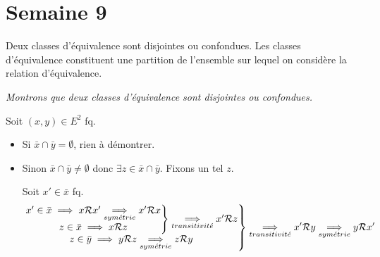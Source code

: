 \documentclass{article}
\renewenvironment{question_kholle}[2][ ]
{
	\subsection{\texorpdfstring{#2}{}}
	\notblank{#1}
	{
		\noindent #1
		\bigbreak
	}
	{}
	\begin{proof}
}
{
	\end{proof}
}
\begin{document}
\begin{question_kholle}
\begin{itemize}[label=$\bullet$ Supposons]
\begin{itemize}[label=$\bullet$ Si]
\begin{itemize}[label=$\bullet$ Si]
			            \end{itemize}
		      \end{itemize}
	\end{itemize}

\end{question_kholle}

\pagebreak\section{Semaine 9}

\begin{question_kholle}
	[\noindent Soit \Rel une relation d'équivalence sur $E$. \\
		Soit $x \in E$. \\
		La classe de $x$, notée $\bar{x}$, est l'ensemble des éléments de $E$ en relation avec x.
		\begin{equation}
			\bar{x} = \left\{ y \in E \;|\; x \Rel y \right\}
		\end{equation}]
	{Deux classes d'équivalence sont disjointes ou confondues. Les classes d'équivalence constituent une partition de l'ensemble sur lequel on considère la relation d'équivalence.}

	\textit{Montrons que deux classes d'équivalence sont disjointes ou confondues.}

	Soit $(x, y) \in E^2$ fq.
	\begin{itemize}[label=\textemdash]
		\item Si $\bar{x} \cap \bar{y} = \emptyset$, rien à démontrer.
		\item Sinon $\bar{x} \cap \bar{y} \neq \emptyset$ donc $\exists z \in \bar{x} \cap \bar{y}$. Fixons un tel $z$.

		      Soit $x' \in \bar{x}$ fq.
		      \begin{equation*}
			      \left.
			      \begin{matrix}
				      \left. \begin{matrix}
					             x' \in \bar{x} \implies x \mathcal R x' \underset{sym\acute{e}trie}{\implies} x' \mathcal R x \\
					             z \in \bar{x} \implies x \mathcal R z
				             \end{matrix}
				      \right\} \underset{transitivit\acute{e}}{\implies} x' \mathcal R z \\
				      z \in \bar{y} \implies y \mathcal R z \underset{sym\acute{e}trie}{\implies} z \mathcal R y
			      \end{matrix}
			      \right\} \underset{transitivit\acute{e}}{\implies} x' \mathcal R y
			      \underset{sym\acute{e}trie}{\implies} y \mathcal R x'
		      \end{equation*}


\end{itemize}
\end{question_kholle}
\end{document}
